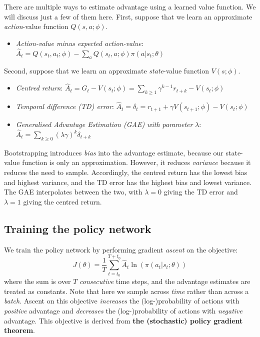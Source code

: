 \documentclass[]{article}
\newcommand{\E}{\mathbb{E}}
\begin{document}
There are multiple ways to estimate advantage using a learned value function. We will discuss just a few of them here. First, suppose that we learn an approximate \emph{action}-value function $Q(s,a;\phi)$.
\begin{itemize}
	\item \emph{Action-value minus expected action-value}: $\hat{A}_t = Q(s_t,a_t;\phi) - \sum_a Q(s_t,a;\phi) \pi(a|s_t;\theta)$
\end{itemize}
Second, suppose that we learn an approximate \emph{state}-value function $V(s;\phi)$. 
\begin{itemize}
	\item \emph{Centred return}: $\hat{A}_t = G_t - V(s_t;\phi) = \sum_{k \geq 1} \gamma^{k-1} r_{t+k} - V(s_t;\phi)$ 
	\item \emph{Temporal difference (TD) error}: $\hat{A}_t = \delta_t = r_{t+1} + \gamma V(s_{t+1};\phi) - V(s_t;\phi)$
	\item \emph{Generalised Advantage Estimation (GAE) with parameter} $\lambda$: $\hat{A}_t = \sum_{k \geq 0} (\lambda \gamma)^k \delta_{t+k}$
\end{itemize}
Bootstrapping introduces \emph{bias} into the advantage estimate, because our state-value function is only an approximation. However, it reduces \emph{variance} because it reduces the need to sample. Accordingly, the centred return has the lowest bias and highest variance, and the TD error has the highest bias and lowest variance. The GAE interpolates between the two, with $\lambda = 0$ giving the TD error and $\lambda = 1$ giving the centred return. 

\newpage

\subsection*{Training the policy network}

We train the policy network by performing gradient \emph{ascent} on the objective:
\begin{equation}\label{eq:objective function for policy network}
	J(\theta) = \frac{1}{T} \sum_{t=t_0}^{T+t_0} \hat{A}_t \ln\left( \pi(a_t|s_t;\theta) \right) 
\end{equation}
where the sum is over $T$ \emph{consecutive} time steps, and the advantage estimates are treated as constants. Note that here we sample across \emph{time} rather than across a \emph{batch}. Ascent on this objective \emph{increases} the (log-)probability of actions with \emph{positive} advantage and \emph{decreases} the (log-)probability of actions with \emph{negative} advantage. This objective is derived from \textbf{the (stochastic) policy gradient theorem}.
\end{document}
